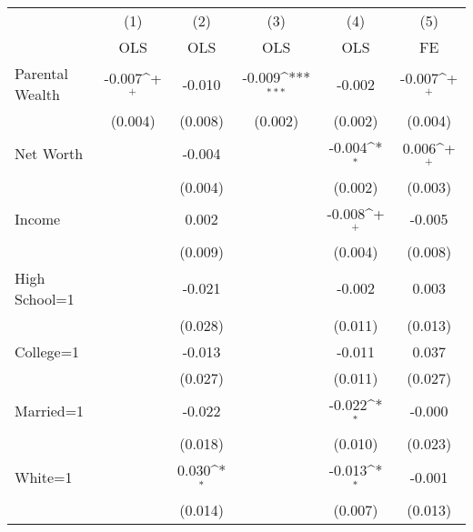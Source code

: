 {
\def\sym#1{\ifmmode^{#1}\else\(^{#1}\)\fi}
\begin{tabular}{l*{5}{c}}
\toprule
                &\multicolumn{1}{c}{(1)}&\multicolumn{1}{c}{(2)}&\multicolumn{1}{c}{(3)}&\multicolumn{1}{c}{(4)}&\multicolumn{1}{c}{(5)}\\
                &\multicolumn{1}{c}{OLS}&\multicolumn{1}{c}{OLS}&\multicolumn{1}{c}{OLS}&\multicolumn{1}{c}{OLS}&\multicolumn{1}{c}{FE}\\
\midrule
\;Parental Wealth&   -0.007\sym{+}  &   -0.010         &   -0.009\sym{***}&   -0.002         &   -0.007\sym{+}  \\
                &  (0.004)         &  (0.008)         &  (0.002)         &  (0.002)         &  (0.004)         \\
\;Net Worth     &                  &   -0.004         &                  &   -0.004\sym{*}  &    0.006\sym{+}  \\
                &                  &  (0.004)         &                  &  (0.002)         &  (0.003)         \\
\;Income        &                  &    0.002         &                  &   -0.008\sym{+}  &   -0.005         \\
                &                  &  (0.009)         &                  &  (0.004)         &  (0.008)         \\
\;High School=1 &                  &   -0.021         &                  &   -0.002         &    0.003         \\
                &                  &  (0.028)         &                  &  (0.011)         &  (0.013)         \\
\;College=1     &                  &   -0.013         &                  &   -0.011         &    0.037         \\
                &                  &  (0.027)         &                  &  (0.011)         &  (0.027)         \\
\;Married=1     &                  &   -0.022         &                  &   -0.022\sym{*}  &   -0.000         \\
                &                  &  (0.018)         &                  &  (0.010)         &  (0.023)         \\
\;White=1       &                  &    0.030\sym{*}  &                  &   -0.013\sym{*}  &   -0.001         \\
                &                  &  (0.014)         &                  &  (0.007)         &  (0.013)         \\

\end{tabular}}
